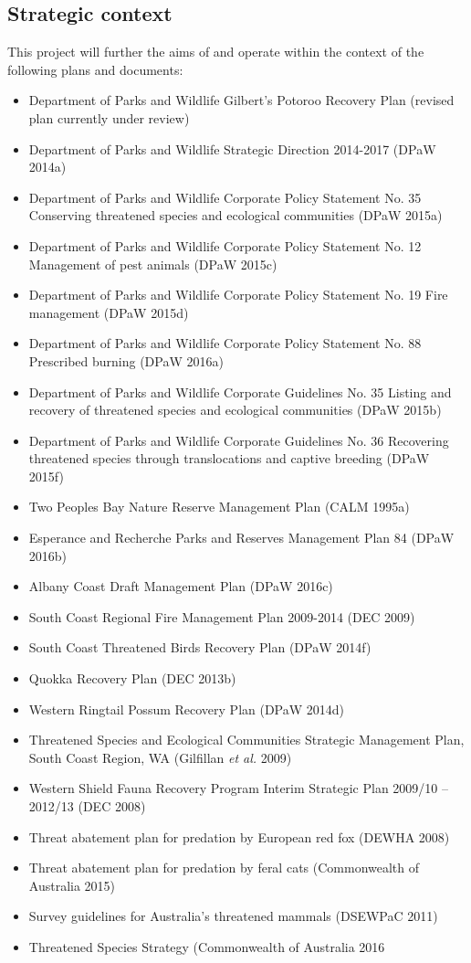 \documentclass[version=last,
    paper=a4,                               %
    10pt,                                   %
    dvipsnames,
    oneside,                              %
    headings=openany,                       %
    open=any,
    BCOR=7mm,                               %
    DIV=15,     %
]{scrbook}
\providecommand{\tightlist}{\setlength{\itemsep}{0pt}\setlength{\parskip}{0pt}}
\begin{document}
\subsection*{Strategic context}

This project will further the aims of and operate within the context of
the following plans and documents:

\begin{itemize}
\tightlist
\item
  Department of Parks and Wildlife Gilbert's Potoroo Recovery Plan
  (revised plan currently under review)
\item
  Department of Parks and Wildlife Strategic Direction 2014-2017 (DPaW
  2014a)
\item
  Department of Parks and Wildlife Corporate Policy Statement No. 35
  Conserving threatened species and ecological communities (DPaW 2015a)
\item
  Department of Parks and Wildlife Corporate Policy Statement No. 12
  Management of pest animals (DPaW 2015c)
\item
  Department of Parks and Wildlife Corporate Policy Statement No. 19
  Fire management (DPaW 2015d)
\item
  Department of Parks and Wildlife Corporate Policy Statement No. 88
  Prescribed burning (DPaW 2016a)
\item
  Department of Parks and Wildlife Corporate Guidelines No. 35 Listing
  and recovery of threatened species and ecological communities (DPaW
  2015b)
\item
  Department of Parks and Wildlife Corporate Guidelines No. 36
  Recovering threatened species through translocations and captive
  breeding (DPaW 2015f)
\item
  Two Peoples Bay Nature Reserve Management Plan (CALM 1995a)
\item
  Esperance and Recherche Parks and Reserves Management Plan 84 (DPaW
  2016b)
\item
  Albany Coast Draft Management Plan (DPaW 2016c)
\item
  South Coast Regional Fire Management Plan 2009-2014 (DEC 2009)
\item
  South Coast Threatened Birds Recovery Plan (DPaW 2014f)
\item
  Quokka Recovery Plan (DEC 2013b)
\item
  Western Ringtail Possum Recovery Plan (DPaW 2014d)
\item
  Threatened Species and Ecological Communities Strategic Management
  Plan, South Coast Region, WA (Gilfillan \emph{et al.} 2009)
\item
  Western Shield Fauna Recovery Program Interim Strategic Plan 2009/10
  -- 2012/13 (DEC 2008)
\item
  Threat abatement plan for predation by European red fox (DEWHA 2008)
\item
  Threat abatement plan for predation by feral cats (Commonwealth of
  Australia 2015)
\item
  Survey guidelines for Australia's threatened mammals (DSEWPaC 2011)
\item
  Threatened Species Strategy (Commonwealth of Australia 2016
\end{itemize}
\end{document}
